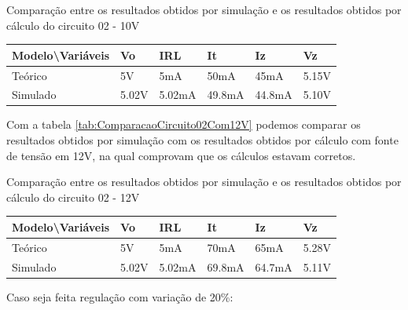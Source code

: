 \begin{quadro}[H]
    \centering
    \caption{Comparação entre os resultados obtidos por simulação e os resultados obtidos por cálculo do circuito 02 - 10V}
    \begin{tabular}{|C{0.19\textwidth}|C{0.13\textwidth}|C{0.13\textwidth}|C{0.13\textwidth}|C{0.13\textwidth}|C{0.13\textwidth}|}
        \hline
        \textbf{Modelo\textbackslash{}Variáveis} & \textbf{Vo} & \textbf{IRL} & \textbf{It} & \textbf{Iz} & \textbf{Vz} \\
        \hline
        Teórico & 5V & 5mA & 50mA & 45mA & 5.15V \\
        \hline
        Simulado & 5.02V & 5.02mA & 49.8mA & 44.8mA & 5.10V \\
        \hline
    \end{tabular}
    \vspace{-0.6cm}
    \label{tab:ComparacaoCircuito02Com10V}
\end{quadro}

Com a tabela \ref{tab:ComparacaoCircuito02Com12V} podemos comparar os resultados obtidos por simulação com os resultados obtidos por cálculo com fonte de tensão em 12V, na qual comprovam que os cálculos estavam corretos.

\begin{quadro}[H]
    \centering
    \caption{Comparação entre os resultados obtidos por simulação e os resultados obtidos por cálculo do circuito 02 - 12V}
    \begin{tabular}{|C{0.19\textwidth}|C{0.13\textwidth}|C{0.13\textwidth}|C{0.13\textwidth}|C{0.13\textwidth}|C{0.13\textwidth}|}
        \hline
        \textbf{Modelo\textbackslash{}Variáveis} & \textbf{Vo} & \textbf{IRL} & \textbf{It} & \textbf{Iz} & \textbf{Vz} \\
        \hline
        Teórico & 5V & 5mA & 70mA & 65mA & 5.28V \\
        \hline
        Simulado & 5.02V & 5.02mA & 69.8mA & 64.7mA & 5.11V \\
        \hline
    \end{tabular}
    \vspace{-0.6cm}
    \label{tab:ComparacaoCircuito02Com12V}
\end{quadro}

Caso seja feita regulação com variação de 20\%:

\begin{Resolucao}[H]
    \label{res:circuito05}
\end{Resolucao}